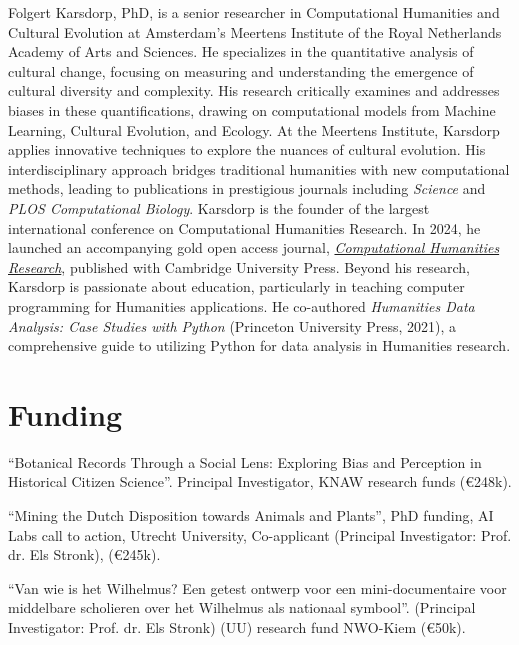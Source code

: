 \documentclass[12pt,letterpaper]{report}
\begin{document}
Folgert Karsdorp, PhD, is a senior researcher in Computational Humanities and
Cultural Evolution at Amsterdam's Meertens Institute of the Royal Netherlands
Academy of Arts and Sciences. He specializes in the quantitative analysis of
cultural change, focusing on measuring and understanding the emergence of
cultural diversity and complexity. His research critically examines and
addresses biases in these quantifications, drawing on computational models from
Machine Learning, Cultural Evolution, and Ecology. At the Meertens Institute,
Karsdorp applies innovative techniques to explore the nuances of cultural
evolution. His interdisciplinary approach bridges traditional humanities with
new computational methods, leading to publications in prestigious journals
including \emph{Science} and \emph{PLOS Computational Biology}. Karsdorp is the
founder of the largest international conference on Computational Humanities
Research. In 2024, he launched an accompanying gold open access journal,
\emph{\href{https://www.cambridge.org/core/journals/computational-humanities-research}{Computational
    Humanities Research}}, published with Cambridge University Press. Beyond his
research, Karsdorp is passionate about education, particularly in teaching
computer programming for Humanities applications. He co-authored
\emph{Humanities Data Analysis: Case Studies with Python} (Princeton University
Press, 2021), a comprehensive guide to utilizing Python for data analysis in
Humanities research.

\nocite{*}
\printbibliography[title=Publications, heading=subbibliography]

\section*{Funding}
\begin{tablist}
\item[2023--26] \tab{}``Botanical Records Through a Social Lens: Exploring Bias
  and Perception in Historical Citizen Science''. Principal Investigator, KNAW
  research funds (€248k).
  \item[2023--27] \tab{}``Mining the Dutch Disposition towards Animals and
    Plants'', PhD funding, AI Labs call to action, Utrecht University,
    Co-applicant (Principal Investigator: Prof. dr. Els Stronk), (€245k).
  \item[2018--18] \tab{}``Van wie is het Wilhelmus? Een getest ontwerp voor een
    mini-documentaire voor middelbare scholieren over het Wilhelmus als
    nationaal symbool''. (Principal Investigator: Prof. dr. Els Stronk) (UU)
    research fund NWO-Kiem (€50k).
\end{tablist}
\end{document}
